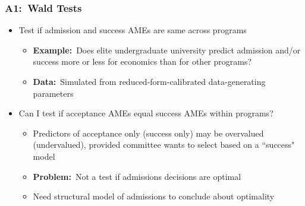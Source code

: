 \documentclass[12pt, aspectratio=169]{beamer}
\begin{document}
\begin{frame}[label=wt]
\frametitle{A1:\ Wald Tests}
\begin{itemize}
\item Test if admission and success AMEs are same across programs
\vspace{5pt}
\begin{itemize}
\item \textbf{Example:}\ Does elite undergraduate university predict admission and/or success more or less for economics than for other programs?
\vspace{5pt}
\item \textbf{Data:}\ Simulated from reduced-form-calibrated data-generating parameters
\vspace{10pt}
\end{itemize}
\item Can I test if acceptance AMEs equal success AMEs within programs?
\vspace{5pt}
\begin{itemize}
\item Predictors of acceptance only (success only) may be overvalued (undervalued), provided committee wants to select based on a ``success" model
\vspace{5pt}
\item \textbf{Problem:}\ Not a test if admissions decisions are optimal
\vspace{5pt}
\item Need structural model of admissions to conclude about optimality
\vspace{10pt}
\end{itemize}
\end{itemize}
\hyperlink{avsa}{}
\end{frame}
\end{document}
